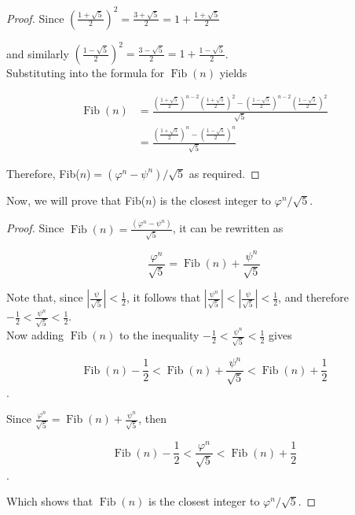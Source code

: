\documentclass[a4paper,12pt]{article}
\begin{document}
\begin{proof}
Since $\left(\frac{1+\sqrt{5}}{2}\right)^{2}=\frac{3+\sqrt{5}}{2}=1+\frac{1+\sqrt{5}}{2}$

and similarly $\left(\frac{1-\sqrt{5}}{2}\right)^{2}=\frac{3-\sqrt{5}}{2}=1+\frac{1-\sqrt{5}}{2}$.\\

Substituting into the formula for $\operatorname{Fib}(n)$ yields

\begin{align*}
  \operatorname{Fib}(n)&=\frac{\left(\frac{1+\sqrt{5}}{2}\right)^{n-2}\left(\frac{1+\sqrt{5}}{2}\right)^{2}-\left(\frac{1-\sqrt{5}}{2}\right)^{n-2}\left(\frac{1-\sqrt{5}}{2}\right)^{2}}{\sqrt{5}}\\
  &=\frac{\left(\frac{1+\sqrt{5}}{2}\right)^{n}-\left(\frac{1-\sqrt{5}}{2}\right)^{n}}{\sqrt{5}}
\end{align*}

Therefore, Fib($n$)$=(\varphi^{n}-\psi^{n})/\sqrt{5}$ as required.

\end{proof}

Now, we will prove that Fib($n$) is the closest integer to $\varphi^{n}/\sqrt{5}$.\\

\begin{proof}

  Since $\operatorname{Fib}(n)=\frac{(\varphi^{n}-\psi^{n})}{\sqrt{5}}$, it can be rewritten as

  $$\frac{\varphi^{n}}{\sqrt{5}} = \operatorname{Fib}(n) + \frac{\psi^{n}}{\sqrt{5}}$$

  Note that, since $\left|\frac{\psi}{\sqrt{5}}\right| < \frac{1}{2}$, it follows that $\left|\frac{\psi^{n}}{\sqrt{5}}\right| < \left|\frac{\psi}{\sqrt{5}}\right| < \frac{1}{2}$, and
  therefore $-\frac{1}{2} < \frac{\psi^{n}}{\sqrt{5}} < \frac{1}{2}$.\\

  Now adding $\operatorname{Fib}(n)$ to the inequality $-\frac{1}{2} < \frac{\psi^{n}}{\sqrt{5}} < \frac{1}{2}$ gives

  $$\operatorname{Fib}(n) -\frac{1}{2} < \operatorname{Fib}(n) + \frac{\psi^{n}}{\sqrt{5}} < \operatorname{Fib}(n) + \frac{1}{2}$$.

  Since $\frac{\varphi^{n}}{\sqrt{5}} = \operatorname{Fib}(n) + \frac{\psi^{n}}{\sqrt{5}}$, then

  $$\operatorname{Fib}(n) -\frac{1}{2} < \frac{\varphi^{n}}{\sqrt{5}} < \operatorname{Fib}(n) + \frac{1}{2}$$.

  Which shows that $\operatorname{Fib}(n)$ is the closest integer to $\varphi^{n}/\sqrt{5}$.
  
\end{proof}
\end{document}
